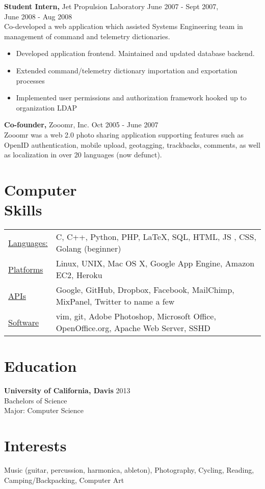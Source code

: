 \documentclass[margin]{res}
\begin{document}
\begin{resume}
 {\bf Student Intern,} Jet Propulsion Laboratory \hfill June 2007 - Sept 2007, \\
 \makebox[3.27in]{\hfill} June 2008 - Aug 2008 \\ 
 Co-developed a web application which assisted Systems Engineering team in management of command and telemetry dictionaries.
 \begin{itemize}
 \item Developed application frontend. Maintained and updated database backend.
 \item Extended command/telemetry dictionary importation and exportation processes
 \item Implemented user permissions and authorization framework hooked up to organization LDAP
 \end{itemize} 

 {\bf Co-founder,} Zooomr, Inc. \hfill Oct 2005 - June 2007 \\
  Zooomr was a web 2.0  photo sharing application supporting features such as OpenID authentication, mobile upload, geotagging, trackbacks, comments, as well as localization in over 20 languages (now defunct).

\section{Computer \\ Skills}
   \begin{tabular}{l p{3in}}
   \underline{Languages:} & C, C++, Python, PHP, \LaTeX, SQL, HTML, JS , CSS, Golang (beginner) \\
   \underline{Platforms} & Linux, UNIX, Mac OS X, Google App Engine, Amazon EC2, Heroku\\
   \underline{APIs} & Google, GitHub, Dropbox, Facebook, MailChimp, MixPanel, Twitter to name a few\\
   \underline{Software} & vim, git, Adobe Photoshop, Microsoft Office, OpenOffice.org, Apache Web Server, SSHD\\
 \end{tabular}

\section{Education} 
{\bf University of California, Davis}  \hfill 2013\\
Bachelors of Science \\
Major: Computer Science \\

\section{Interests}
Music (guitar, percussion, harmonica, ableton), Photography, Cycling, Reading, Camping/Backpacking, Computer Art

\end{resume} 
\end{document}
